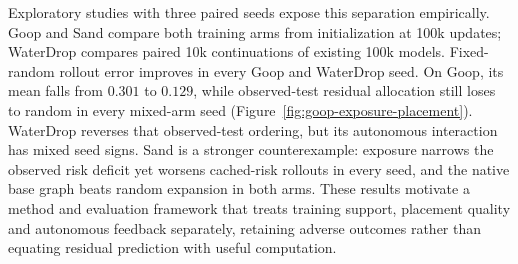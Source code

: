 Exploratory studies with three paired seeds expose this separation empirically. Goop and Sand compare both training arms from initialization at 100k updates; WaterDrop compares paired 10k continuations of existing 100k models. Fixed-random rollout error improves in every Goop and WaterDrop seed. On Goop, its mean falls from $0.301$ to $0.129$, while observed-test residual allocation still loses to random in every mixed-arm seed (Figure~\ref{fig:goop-exposure-placement}). WaterDrop reverses that observed-test ordering, but its autonomous interaction has mixed seed signs. Sand is a stronger counterexample: exposure narrows the observed risk deficit yet worsens cached-risk rollouts in every seed, and the native base graph beats random expansion in both arms. These results motivate a method and evaluation framework that treats training support, placement quality and autonomous feedback separately, retaining adverse outcomes rather than equating residual prediction with useful computation.
